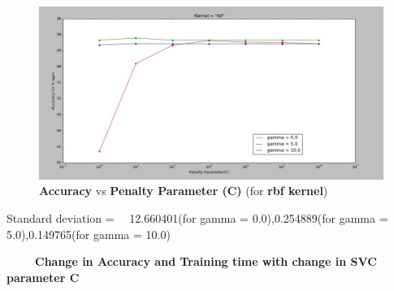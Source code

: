 \documentclass{beamer}
\newcommand\tab[1][1cm]{\hspace*{#1}}
\begin{document}
\begin{frame}[t, allowframebreaks]
\begin{vwcol}[widths={6.5,3.0}, sep=.8cm, justify=flush, rule=0pt, indent=1em]
\begin{minipage}{0.3\linewidth}
\end{minipage}
\end{vwcol}

\raggedright
\begin{figure}[!h]
  \includegraphics[width=0.8\linewidth]{rbf_all_in_one.JPG}
  \caption*{\tiny \textbf{Accuracy }vs\textbf{ Penalty Parameter (C)} (for \textbf{rbf kernel})}
  \label{fig:}
\end{figure}

\begin{block}
\LARGE Standard deviation = \ \ 12.660401(for gamma = 0.0),\linebreak \tab \tab \tab 0.254889(for gamma = 5.0),\linebreak \tab \tab \tab 0.149765(for gamma = 10.0)
\end{block}
\pagebreak


\fontsize{8}{9.6}\selectfont
\ \ \ \ \ \textbf{Change in Accuracy and Training time with change in SVC parameter C}
\linebreak

\begin{vwcol}[widths={6.5,3.0}, sep=.8cm, justify=flush, rule=0pt, indent=1em]
\begin{minipage}{0.7\linewidth}


\end{minipage}
\end{vwcol}
\end{frame}
\end{document}
